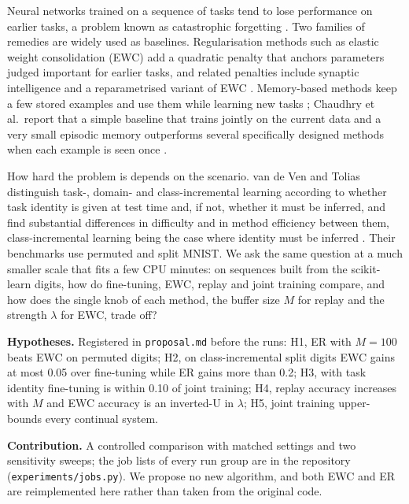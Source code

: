 Neural networks trained on a sequence of tasks tend to lose performance on earlier tasks, a problem known as catastrophic forgetting \cite{goodfellow2013empirical,kirkpatrick2017overcoming}. Two families of remedies are widely used as baselines. Regularisation methods such as elastic weight consolidation (EWC) \cite{kirkpatrick2017overcoming} add a quadratic penalty that anchors parameters judged important for earlier tasks, and related penalties include synaptic intelligence \cite{zenke2017continual} and a reparametrised variant of EWC \cite{liu2018rotate}. Memory-based methods keep a few stored examples and use them while learning new tasks \cite{lopezpaz2017gradient,chaudhry2018efficient,rebuffi2017icarl,buzzega2020dark}; Chaudhry et al.\ report that a simple baseline that trains jointly on the current data and a very small episodic memory outperforms several specifically designed methods when each example is seen once \cite{chaudhry2019tiny}.

How hard the problem is depends on the scenario. van de Ven and Tolias distinguish task-, domain- and class-incremental learning according to whether task identity is given at test time and, if not, whether it must be inferred, and find substantial differences in difficulty and in method efficiency between them, class-incremental learning being the case where identity must be inferred \cite{ven2019three}. Their benchmarks use permuted and split MNIST. We ask the same question at a much smaller scale that fits a few CPU minutes: on sequences built from the scikit-learn digits, how do fine-tuning, EWC, replay and joint training compare, and how does the single knob of each method, the buffer size $M$ for replay and the strength $\lambda$ for EWC, trade off?

\textbf{Hypotheses.} Registered in \texttt{proposal.md} before the runs: H1, ER with $M{=}100$ beats EWC on permuted digits; H2, on class-incremental split digits EWC gains at most 0.05 over fine-tuning while ER gains more than 0.2; H3, with task identity fine-tuning is within 0.10 of joint training; H4, replay accuracy increases with $M$ and EWC accuracy is an inverted-U in $\lambda$; H5, joint training upper-bounds every continual system.

\textbf{Contribution.} A controlled comparison with matched settings and two sensitivity sweeps; the job lists of every run group are in the repository (\texttt{experiments/jobs.py}). We propose no new algorithm, and both EWC and ER are reimplemented here rather than taken from the original code.
